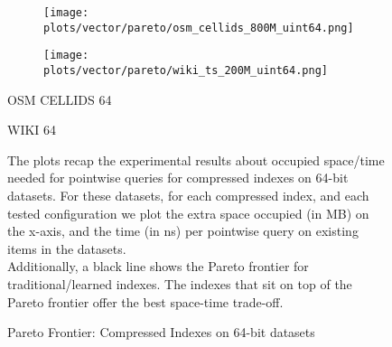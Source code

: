 \documentclass{article}
\begin{document}
\begin{figure}[!htbp]
{\begin{minipage}[t][0.98\textheight][t]{\textwidth}
    \begin{minipage}{0.48\linewidth}
        \begin{figure}[H]
        \texttt{[image: plots/vector/pareto/osm\_cellids\_800M\_uint64.png]}
        \end{figure}
    \end{minipage}
    \begin{minipage}{0.48\linewidth}
        \begin{figure}[H]
        \texttt{[image: plots/vector/pareto/wiki\_ts\_200M\_uint64.png]}
        \end{figure}
    \end{minipage}
    \begin{minipage}{0.48\linewidth}
    \begin{center}
        OSM CELLIDS 64
    \end{center}
    \end{minipage}
    \begin{minipage}{0.48\linewidth}
    \begin{center}
        WIKI 64
    \end{center}
    \end{minipage}

    \vfill
    
    \begin{minipage}{\linewidth}
        The plots recap the experimental results about occupied space/time needed for pointwise queries for compressed indexes on 64-bit datasets. For these datasets, for each compressed index, and each tested configuration we plot the extra space occupied (in MB) on the x-axis, and the time (in ns) per pointwise query on existing items in the datasets. \\

    Additionally, a black line shows the Pareto frontier for traditional/learned indexes. The indexes that sit on top of the Pareto frontier offer the best space-time trade-off. 
            \end{minipage}
    \vspace{10px}
\end{minipage}
}
\caption{Pareto Frontier: Compressed Indexes on 64-bit datasets}
\end{figure}
\end{document}
